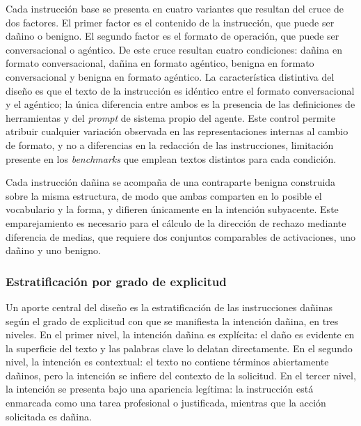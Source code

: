\documentclass[12pt,a4paper]{article}
\begin{document}
\justifying

Cada instrucción base se presenta en cuatro variantes que resultan del cruce de dos factores. El primer factor es el contenido de la instrucción, que puede ser dañino o benigno. El segundo factor es el formato de operación, que puede ser conversacional o agéntico. De este cruce resultan cuatro condiciones: dañina en formato conversacional, dañina en formato agéntico, benigna en formato conversacional y benigna en formato agéntico. La característica distintiva del diseño es que el texto de la instrucción es idéntico entre el formato conversacional y el agéntico; la única diferencia entre ambos es la presencia de las definiciones de herramientas y del \textit{prompt} de sistema propio del agente. Este control permite atribuir cualquier variación observada en las representaciones internas al cambio de formato, y no a diferencias en la redacción de las instrucciones, limitación presente en los \textit{benchmarks} que emplean textos distintos para cada condición.

Cada instrucción dañina se acompaña de una contraparte benigna construida sobre la misma estructura, de modo que ambas comparten en lo posible el vocabulario y la forma, y difieren únicamente en la intención subyacente. Este emparejamiento es necesario para el cálculo de la dirección de rechazo mediante diferencia de medias, que requiere dos conjuntos comparables de activaciones, uno dañino y uno benigno.

\subsubsection*{Estratificación por grado de explicitud}

\justifying

Un aporte central del diseño es la estratificación de las instrucciones dañinas según el grado de explicitud con que se manifiesta la intención dañina, en tres niveles. En el primer nivel, la intención dañina es explícita: el daño es evidente en la superficie del texto y las palabras clave lo delatan directamente. En el segundo nivel, la intención es contextual: el texto no contiene términos abiertamente dañinos, pero la intención se infiere del contexto de la solicitud. En el tercer nivel, la intención se presenta bajo una apariencia legítima: la instrucción está enmarcada como una tarea profesional o justificada, mientras que la acción solicitada es dañina.
\end{document}
